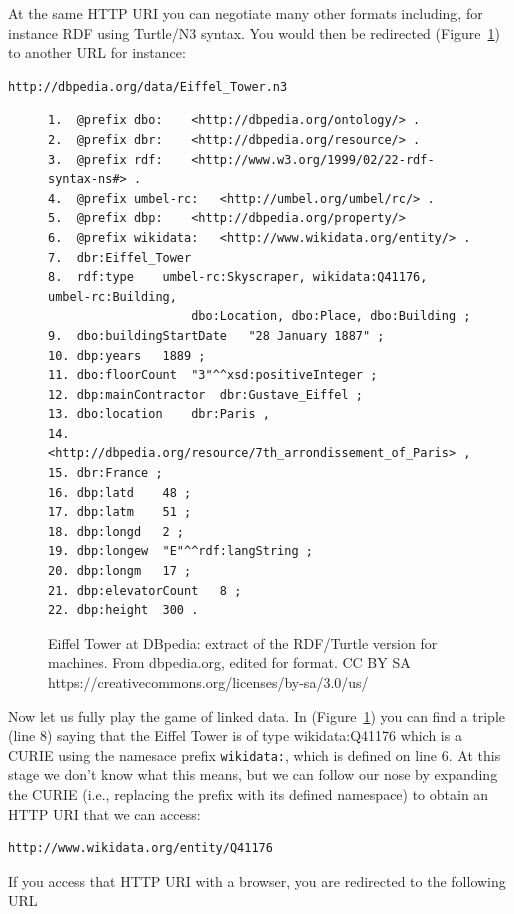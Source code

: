 At the same HTTP URI you can negotiate many other formats including, for
instance RDF using Turtle/N3 syntax. You would then be redirected
(Figure~\ref{fig:ch5.8}) to another URL for instance:

\begin{lstlisting}
http://dbpedia.org/data/Eiffel_Tower.n3
\end{lstlisting}


\begin{figure}
 \begin{lstlisting}
1.	@prefix dbo:	<http://dbpedia.org/ontology/> .
2.	@prefix dbr:	<http://dbpedia.org/resource/> .
3.	@prefix rdf:	<http://www.w3.org/1999/02/22-rdf-syntax-ns#> .
4.	@prefix umbel-rc:	<http://umbel.org/umbel/rc/> .
5.	@prefix dbp:	<http://dbpedia.org/property/>
6.	@prefix wikidata:	<http://www.wikidata.org/entity/> .
7.	dbr:Eiffel_Tower
8.	rdf:type	umbel-rc:Skyscraper, wikidata:Q41176, umbel-rc:Building,
                    dbo:Location, dbo:Place, dbo:Building ;
9.	dbo:buildingStartDate	"28 January 1887" ;
10.	dbp:years	1889 ;
11.	dbo:floorCount	"3"^^xsd:positiveInteger ;
12.	dbp:mainContractor	dbr:Gustave_Eiffel ;
13.	dbo:location	dbr:Paris ,
14.	<http://dbpedia.org/resource/7th_arrondissement_of_Paris> ,
15.	dbr:France ;
16.	dbp:latd	48 ;
17.	dbp:latm	51 ;
18.	dbp:longd	2 ;
19.	dbp:longew	"E"^^rdf:langString ;
20.	dbp:longm	17 ;
21.	dbp:elevatorCount	8 ;
22.	dbp:height	300 .
 \end{lstlisting}
    \caption{Eiffel Tower at DBpedia: extract of the RDF/Turtle version for
machines. From dbpedia.org, edited for format.  CC BY SA https://creativecommons.org/licenses/by-sa/3.0/us/}
    \label{fig:ch5.8}
\end{figure}

Now let us fully play the game of linked data. In (Figure~\ref{fig:ch5.8}) you can
find a triple (line 8) saying that the Eiffel Tower is of type
wikidata:Q41176 which is a CURIE using the namesace prefix \texttt{wikidata:}, which is defined 
on line 6. At this stage we don't know what this
means, but we can follow our nose by expanding the CURIE (i.e., 
replacing the prefix with its defined  namespace) to obtain an HTTP URI that we
can access:

\begin{lstlisting}
http://www.wikidata.org/entity/Q41176
\end{lstlisting}

If you access that HTTP URI with a browser, you are redirected to the
following URL

